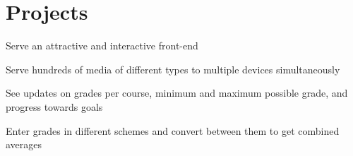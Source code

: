 \documentclass[]{deedy-resume-openfont}
\begin{document}
\begin{minipage}[t]{0.95\textwidth}



\section{Projects}



\begin{tightemize}
\item Serve an attractive and interactive front-end
\item Serve hundreds of media of different types to multiple devices simultaneously
\end{tightemize}

\begin{tightemize}
\item See updates on grades per course, minimum and maximum possible grade, and progress towards goals
\item Enter grades in different schemes and convert between them to get combined averages
\end{tightemize}


\end{minipage}
\end{document}
